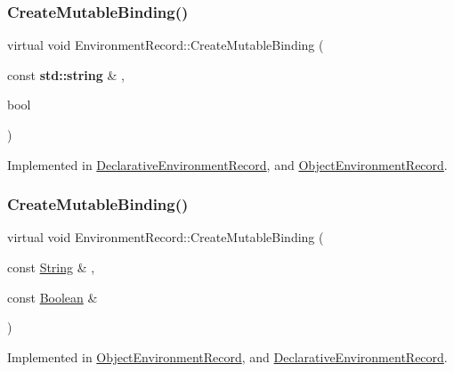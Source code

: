 \subsubsection{\texorpdfstring{Create\+Mutable\+Binding()}{CreateMutableBinding()}\hspace{0.1cm}{\footnotesize\ttfamily [1/2]}}
{\footnotesize\ttfamily virtual void Environment\+Record\+::\+Create\+Mutable\+Binding (\begin{DoxyParamCaption}\item[{const \textbf{ std\+::string} \&}]{,  }\item[{bool}]{ }\end{DoxyParamCaption})\hspace{0.3cm}{\ttfamily [pure virtual]}}



Implemented in \hyperlink{struct_declarative_environment_record_aa2bc21d70c3869a2065e375dbadd5967}{Declarative\+Environment\+Record}, and \hyperlink{struct_object_environment_record_ae54124ae909a73fb5d3b8e9f7b9f3807}{Object\+Environment\+Record}.

\mbox{\label{struct_environment_record_aded45e79485e73e080980e6ff611dc0d}} 
\subsubsection{\texorpdfstring{Create\+Mutable\+Binding()}{CreateMutableBinding()}\hspace{0.1cm}{\footnotesize\ttfamily [2/2]}}
{\footnotesize\ttfamily virtual void Environment\+Record\+::\+Create\+Mutable\+Binding (\begin{DoxyParamCaption}\item[{const \hyperlink{struct_string}{String} \&}]{,  }\item[{const \hyperlink{struct_boolean}{Boolean} \&}]{ }\end{DoxyParamCaption})\hspace{0.3cm}{\ttfamily [pure virtual]}}



Implemented in \hyperlink{struct_object_environment_record_a253c1137a60f79ea6d07ec89d04ca067}{Object\+Environment\+Record}, and \hyperlink{struct_declarative_environment_record_af71c0900f0d02f7a74cfd60b0655a9b5}{Declarative\+Environment\+Record}.

